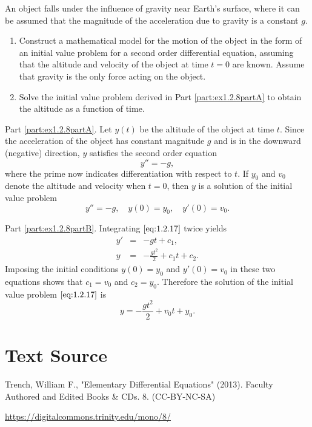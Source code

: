 \documentclass{ximera}
\begin{document}
\begin{example}\label{example:1.2.8}
An object falls under the influence of gravity near Earth's
surface, where it can be assumed that the magnitude of the
acceleration due to gravity is a constant $g$.
\begin{enumerate}
\item \label{part:ex1.2.8partA}
 Construct a mathematical model for the motion of the object in the
form of an initial value problem for a second order differential
equation, assuming that the altitude and velocity of the object at
time $t=0$ are known. Assume that gravity is the only force acting on
the object.
\item \label{part:ex1.2.8partB}
 Solve the initial value problem derived in Part \ref{part:ex1.2.8partA} to obtain the
altitude as a function of time.
\end{enumerate}
 
 
\begin{explanation} Part \ref{part:ex1.2.8partA}. Let $y(t)$ be the altitude of the object at time $t$.
 Since the acceleration of the object has
constant magnitude $g$ and is in the downward (negative) direction,
$y$ satisfies the second order equation
$$
y''=-g,
$$
where the prime now indicates differentiation with respect to $t$.
If $y_0$ and $v_0$ denote the altitude and velocity when
$t=0$, then $y$ is a solution of the initial value problem
\begin{equation} \label{eq:1.2.17}
y''=-g,\quad  y(0)=y_0,\quad y'(0)=v_0.
\end{equation}
 
Part \ref{part:ex1.2.8partB}.
Integrating $\eqref{eq:1.2.17}$ twice yields
\begin{eqnarray*}
y'&=&-gt+c_1, \\
y&=&-\frac{gt^2}{2}+c_1t+c_2.
\end{eqnarray*}
Imposing the initial conditions $y(0)=y_0$ and $y'(0)=v_0$ in these
two equations shows that $c_1=v_0$ and $c_2=y_0$. Therefore the
solution of the initial value problem $\eqref{eq:1.2.17}$ is
$$
y=- \frac{gt^2}{2}+v_0t+y_0.
$$
\end{explanation}
\end{example}
 
 
\section*{Text Source}
Trench, William F., "Elementary Differential Equations" (2013). Faculty Authored and Edited Books \& CDs. 8. (CC-BY-NC-SA)
 
\href{https://digitalcommons.trinity.edu/mono/8/}{https://digitalcommons.trinity.edu/mono/8/}
\end{document}
